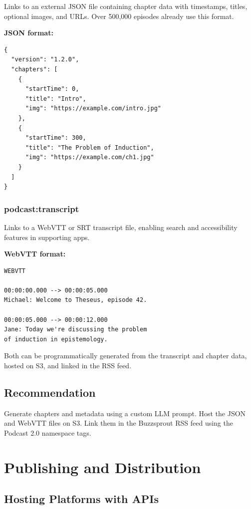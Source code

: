\documentclass[11pt,letterpaper]{article}
\begin{document}
Links to an external JSON file containing chapter data with timestamps, titles, optional images, and URLs. Over 500,000 episodes already use this format.

\textbf{JSON format:}

\begin{verbatim}
{
  "version": "1.2.0",
  "chapters": [
    {
      "startTime": 0,
      "title": "Intro",
      "img": "https://example.com/intro.jpg"
    },
    {
      "startTime": 300,
      "title": "The Problem of Induction",
      "img": "https://example.com/ch1.jpg"
    }
  ]
}
\end{verbatim}

\subsubsection{podcast:transcript}

Links to a WebVTT or SRT transcript file, enabling search and accessibility features in supporting apps.

\textbf{WebVTT format:}

\begin{verbatim}
WEBVTT

00:00:00.000 --> 00:00:05.000
Michael: Welcome to Theseus, episode 42.

00:00:05.000 --> 00:00:12.000
Jane: Today we're discussing the problem
of induction in epistemology.
\end{verbatim}

Both can be programmatically generated from the transcript and chapter data, hosted on S3, and linked in the RSS feed.

\subsection{Recommendation}

Generate chapters and metadata using a custom LLM prompt. Host the JSON and WebVTT files on S3. Link them in the Buzzsprout RSS feed using the Podcast 2.0 namespace tags.

\vspace{12pt}

\section{Publishing and Distribution}

\subsection{Hosting Platforms with APIs}
\end{document}
